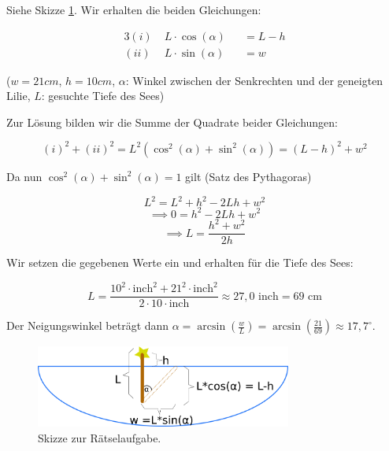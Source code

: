 \item Siehe Skizze \ref{ex-trigonometry-1-img-b}. Wir erhalten die beiden Gleichungen:

\begin{alignat*}{3}
(i)  \;  & L \cdot \cos(\alpha)  &&= L - h \\
(ii) \; &  L \cdot \sin(\alpha)  &&= w
\end{alignat*}

($w=21cm$, $h=10cm$, $\alpha$: Winkel zwischen der Senkrechten und der geneigten Lilie, $L$: gesuchte Tiefe des Sees)

Zur Lösung bilden wir die Summe der Quadrate beider Gleichungen:

$$(i)^2+(ii)^2 = L^2 (\cos^2(\alpha) + \sin^2(\alpha)) = (L-h)^2 + w^2$$

Da nun $\cos^2(\alpha) + \sin^2(\alpha) = 1$ gilt (Satz des Pythagoras)

$$ L^2 = L^2 + h^2 - 2Lh + w^2$$
$$\implies 0 = h^2-2Lh+w^2$$
$$\implies L = \frac{h^2+w^2}{2h}$$

Wir setzen die gegebenen Werte ein und erhalten für die Tiefe des Sees:

$$L=\frac{10^2\cdot\text{inch}^2 + 21^2\cdot\text{inch}^2}{2\cdot 10 \cdot\text{inch}} \approx 27,0 \text{ inch} = 69 \text{ cm}$$

Der Neigungswinkel beträgt dann $\alpha = \arcsin(\frac{w}{L})= \arcsin(\frac{21}{69}) \approx 17,7 ^ \circ$.

\begin{figure}[ht]
	\centering
	\includegraphics[width=0.75\textwidth]{../pool/ex-trigonometry-1-img-b.png}
	\caption{Skizze zur Rätselaufgabe.}
	\label{ex-trigonometry-1-img-b}
\end{figure}


